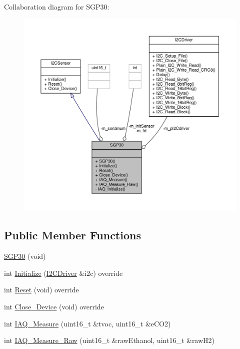 Collaboration diagram for S\+G\+P30\+:\nopagebreak
\begin{figure}[H]
\begin{center}
\leavevmode
\includegraphics[width=350pt]{classSGP30__coll__graph}
\end{center}
\end{figure}
\subsection*{Public Member Functions}
\begin{DoxyCompactItemize}
\item 
\hyperlink{classSGP30_a995b5a2cf525479cbd930b54fb7d8f80}{S\+G\+P30} (void)
\item 
int \hyperlink{classSGP30_ad34fe8539ef007f55a0b3140889fdd6f}{Initialize} (\hyperlink{classI2CDriver}{I2\+C\+Driver} \&i2c) override
\item 
int \hyperlink{classSGP30_a4934ef3a64eb0782a6d956c6526e4186}{Reset} (void) override
\item 
int \hyperlink{classSGP30_a3feaf2623eb853169d14687e7ad1db24}{Close\+\_\+\+Device} (void) override
\item 
int \hyperlink{classSGP30_ac43bc058d733c27c6356ece89730232c}{I\+A\+Q\+\_\+\+Measure} (uint16\+\_\+t \&tvoc, uint16\+\_\+t \&e\+C\+O2)
\item 
int \hyperlink{classSGP30_aba7c9499ebc5a8aea6d3a5aaf23585ee}{I\+A\+Q\+\_\+\+Measure\+\_\+\+Raw} (uint16\+\_\+t \&raw\+Ethanol, uint16\+\_\+t \&raw\+H2)
\end{DoxyCompactItemize}
